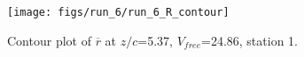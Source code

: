 \begin{figure}[H]
\centering
\texttt{[image: figs/run\_6/run\_6\_R\_contour]}
\caption{Contour plot of $\overline{r}$ at $z/c$=5.37, $V_{free}$=24.86, station 1.}
\label{fig:run_6_R_contour}
\end{figure}


